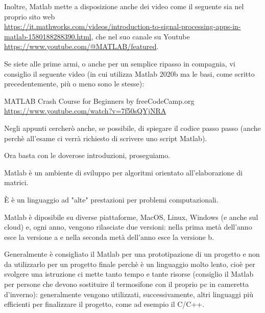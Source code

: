 \begin{tcolorbox}
    Inoltre, Matlab mette a disposizione anche dei video come il seguente sia nel proprio sito web \\ 
    \url{https://it.mathworks.com/videos/introduction-to-signal-processing-apps-in-matlab-1580188288390.html}, 
    che nel suo canale su Youtube \url{https://www.youtube.com/@MATLAB/featured}. \newline 

    Se siete alle prime armi, o anche per un semplice ripasso in compagnia, vi consiglio il seguente video (in cui utilizza Matlab 2020b ma le basi, come scritto precedentemente, più o meno sono le stesse): \newline 

    MATLAB Crash Course for Beginners by freeCodeCamp.org \\ 
    \url{https://www.youtube.com/watch?v=7f50sQYjNRA} \newline 

    Negli appunti cercherò anche, se possibile, di spiegare il codice passo passo (anche perchè all'esame ci verrà richiesto di scrivere uno script Matlab). \newline 

    Ora basta con le doverose introduzioni, proseguiamo. 
\end{tcolorbox}

Matlab è un ambiente di sviluppo per algoritmi orientato all'elaborazione di matrici. \newline 

È è un linguaggio ad "alte" prestazioni per problemi computazionali. \newline 

Matlab è diposibile su diverse piattaforme, MacOS, Linux, Windows (e anche sul cloud) e, ogni anno, 
vengono rilasciate due versioni: nella prima metà dell'anno esce la versione a e nella seconda metà dell'anno esce la versione b. \newline 

Generalmente è consigliato il Matlab per una prototipazione di un progetto e non da utilizzarlo per un progetto finale perchè è un linguaggio molto lento, 
cioè per svolgere una istruzione ci mette tanto tempo e tante risorse (consiglio il Matlab per persone che devono sostituire il termosifone con il proprio pc in cameretta d'inverno): 
generalmente vengono utilizzati, successivamente, altri linguaggi più efficienti per finalizzare il progetto, come ad esempio il C/C++. \newline 

